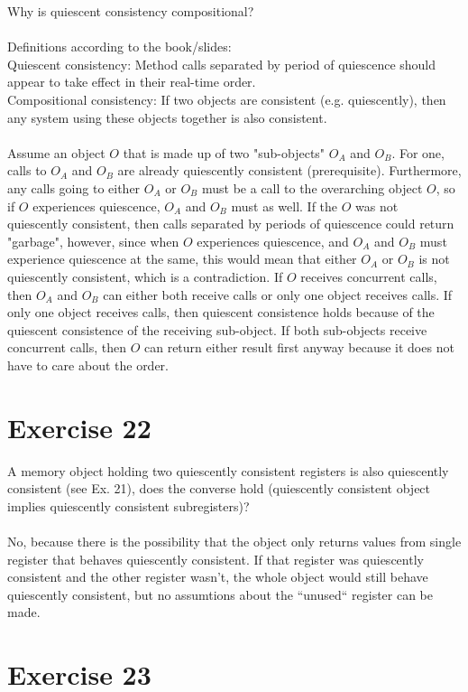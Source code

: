 \documentclass[a4paper,%
11pt,%
DIV=14,
headsepline,%
headings=normal,
]{scrartcl}
\newcommand{\exercise}[1]{\section*{Exercise #1}}
\begin{document}
Why is quiescent consistency compositional?\\
\\
Definitions according to the book/slides:\\
Quiescent consistency: Method calls separated by period of quiescence should appear to take effect in their real-time order.\\
Compositional consistency: If two objects are consistent (e.g. quiescently), then any system using these objects together is also consistent.\\
\\
Assume an object $O$ that is made up of two "sub-objects" $O_A$ and $O_B$. For one, calls to $O_A$ and $O_B$ are already quiescently consistent (prerequisite). Furthermore, any calls going to either $O_A$ or $O_B$ must be a call to the overarching object $O$, so if $O$ experiences quiescence, $O_A$ and $O_B$ must as well. If the $O$ was not quiescently consistent, then calls separated by periods of quiescence could return "garbage", however, since when $O$ experiences quiescence, and $O_A$ and $O_B$ must experience quiescence at the same, this would mean that either $O_A$ or $O_B$ is not quiescently consistent, which is a contradiction. If $O$ receives concurrent calls, then $O_A$ and $O_B$ can either both receive calls or only one object receives calls. If only one object receives calls, then quiescent consistence holds because of the quiescent consistence of the receiving sub-object. If both sub-objects receive concurrent calls, then $O$ can return either result first anyway because it does not have to care about the order.
 
\exercise{22}

A memory object holding two quiescently consistent registers is also quiescently consistent (see Ex. 21), does the converse hold (quiescently consistent object implies quiescently consistent subregisters)?\\
\\
No, because there is the possibility that the object only returns values from single register that behaves quiescently consistent. If that register was quiescently consistent and the other register wasn't, the whole object would still behave quiescently consistent, but no assumtions about the ``unused`` register can be made.

\exercise{23}
\end{document}
